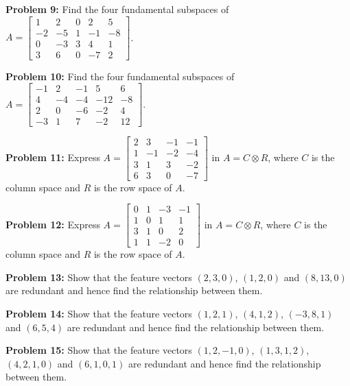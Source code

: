 \documentclass[
  letterpaper,
  DIV=11,
  numbers=noendperiod]{scrreprt}
\theoremstyle{plain}
\theoremstyle{definition}
\theoremstyle{remark}
\begin{document}
\textbf{Problem 9:} Find the four fundamental subspaces of
\(A=\begin{bmatrix} 1&2&0&2&5\\-2&-5&1&-1&-8\\0&-3&3&4&1\\3&6&0&-7&2\end{bmatrix}\).

\textbf{Problem 10:} Find the four fundamental subspaces of
\(A=\begin{bmatrix}-1&2&-1&5&6\\4&-4&-4&-12&-8\\2&0&-6&-2&4\\-3&1&7&-2&12\end{bmatrix}\).

\textbf{Problem 11:} Express
\(A=\begin{bmatrix}2&3&-1&-1\\1&-1&-2&-4\\3&1&3&-2\\6&3&0&-7\end{bmatrix}\)
in \(A=C\otimes R\), where \(C\) is the column space and \(R\) is the
row space of \(A\).

\textbf{Problem 12:} Express
\(A=\begin{bmatrix}0&1&-3&-1\\1&0&1&1\\3&1&0&2\\1&1&-2&0\end{bmatrix}\)
in \(A=C\otimes R\), where \(C\) is the column space and \(R\) is the
row space of \(A\).

\textbf{Problem 13:} Show that the feature vectors \((2,3,0)\),
\((1,2,0)\) and \((8,13,0)\) are redundant and hence find the
relationship between them.

\textbf{Problem 14:} Show that the feature vectors \((1,2,1)\),
\((4,1,2)\), \((-3,8,1)\) and \((6,5,4)\) are redundant and hence find
the relationship between them.

\textbf{Problem 15:} Show that the feature vectors \((1,2,-1,0)\),
\((1,3,1,2)\), \((4,2,1,0)\) and \((6,1,0,1)\) are redundant and hence
find the relationship between them.
\end{document}
